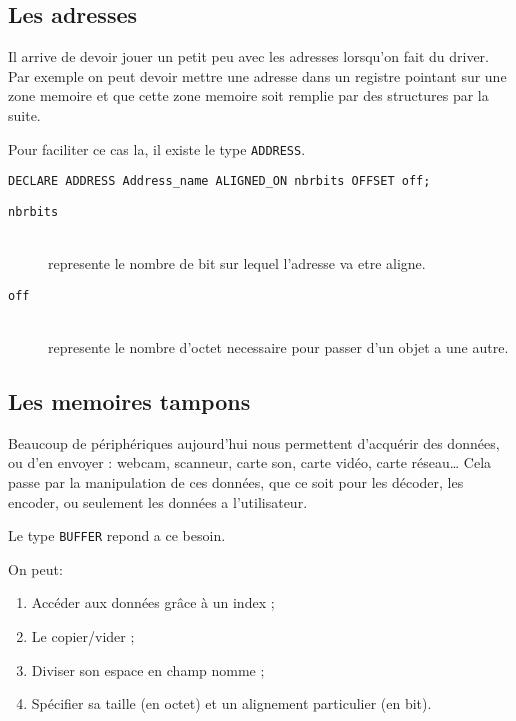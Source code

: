 \documentclass{rtxreport}
\begin{document}
\subsection{Les adresses}

Il arrive de devoir jouer un petit peu avec les adresses lorsqu'on fait du driver.
Par exemple on peut devoir mettre une adresse dans un registre pointant sur une zone memoire
et que cette zone memoire soit remplie par des structures par la suite.

Pour faciliter ce cas la, il existe le type \texttt{ADDRESS}.

\begin{lstlisting}[caption=Instanciation d'une adresse]
DECLARE ADDRESS Address_name ALIGNED_ON nbrbits OFFSET off;
\end{lstlisting}

\begin{description}
\item[\texttt{nbrbits}] \hfill \\
	represente le nombre de bit sur lequel l'adresse va etre aligne.
\item[\texttt{off}] \hfill \\
	represente le nombre d'octet necessaire pour passer d'un objet a une autre.
\end{description}


\subsection{Les memoires tampons}
Beaucoup de périphériques aujourd’hui nous permettent d’acquérir des données,
ou d’en envoyer : webcam, scanneur, carte son, carte vidéo, carte réseau\ldots
Cela passe par la manipulation de ces données, que ce soit pour les décoder,
les encoder, ou seulement les données a l’utilisateur.

Le type \texttt{BUFFER} repond a ce besoin.

On peut:
\begin{enumerate}
	\item Accéder aux données grâce à un index ; 
	\item Le copier/vider ; 
	\item Diviser son espace en champ nomme ; 
	\item Spécifier sa taille (en octet) et un alignement particulier (en bit).
\end{enumerate}
\end{document}
